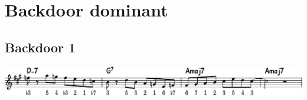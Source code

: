 \documentclass[11pt]{article}
\begin{document}
\section{Backdoor dominant}
\label{sec:org59c6354}

\subsection{Backdoor 1}
\label{sec:org1b28764}
\begin{center}
\includegraphics[width=.98\linewidth]{backdoor-1.pdf}
\end{center}
\end{document}
